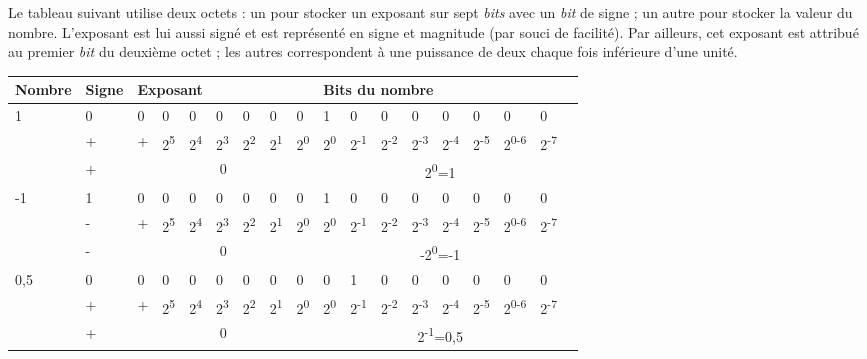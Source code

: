 Le tableau suivant utilise deux octets : un pour stocker un exposant sur
sept \emph{bits} avec un \emph{bit} de signe ; un autre pour stocker la
valeur du nombre. L'exposant est lui aussi signé et est représenté en
signe et magnitude (par souci de facilité). Par ailleurs, cet exposant
est attribué au premier \emph{bit} du deuxième octet ; les autres
correspondent à une puissance de deux chaque fois inférieure d'une
unité.

\begin{table}
\centering
\begin{tabular}{p{}|p{}|l|l|l|l|l|l|l|l|l|l|l|l|l|l|l|l|}\hline
  \rowcolor{gris-tab-entete}\bf Nombre&\bf Signe&\multicolumn{7}{l|}{\bf Exposant}&\multicolumn{8}{l|}{\bf Bits du nombre} \\
  \hline
  \multirow{3}{2cm}{1} & 0 & 0 & 0 & 0 & 0 & 0 & 0 & 0 & 1 & 0 & 0 & 0 & 0 & 0 & 0 & 0\\ 
  \cline{2-17}
    &+&+&2\textsuperscript{5}&2\textsuperscript{4}&2\textsuperscript{3}&2\textsuperscript{2}&2\textsuperscript{1}&2\textsuperscript{0}&2\textsuperscript{0}&2\textsuperscript{-1}&2\textsuperscript{-2}&2\textsuperscript{-3}&2\textsuperscript{-4}&2\textsuperscript{-5}&2\textsuperscript{0-6}&2\textsuperscript{-7}\\ 
  \cline{2-17}
    &+&\multicolumn{7}{c|}{0}&\multicolumn{8}{c|}{2\textsuperscript{0}=1}\\ 
  \hline
  
  \multirow{3}{2cm}{-1} & 1 & 0 & 0 & 0 & 0 & 0 & 0 & 0 & 1 & 0 & 0 & 0 & 0 & 0 & 0 & 0\\ 
  \cline{2-17}
    &-&+&2\textsuperscript{5}&2\textsuperscript{4}&2\textsuperscript{3}&2\textsuperscript{2}&2\textsuperscript{1}&2\textsuperscript{0}&2\textsuperscript{0}&2\textsuperscript{-1}&2\textsuperscript{-2}&2\textsuperscript{-3}&2\textsuperscript{-4}&2\textsuperscript{-5}&2\textsuperscript{0-6}&2\textsuperscript{-7}\\ 
  \cline{2-17}
    &-&\multicolumn{7}{c|}{0}&\multicolumn{8}{c|}{-2\textsuperscript{0}=-1}\\ 
  \hline
  
  \multirow{3}{2cm}{0,5} & 0 & 0 & 0 & 0 & 0 & 0 & 0 & 0 & 0 & 1 & 0 & 0 & 0 & 0 & 0 & 0\\ 
  \cline{2-17}
     &+&+&2\textsuperscript{5}&2\textsuperscript{4}&2\textsuperscript{3}&2\textsuperscript{2}&2\textsuperscript{1}&2\textsuperscript{0}&2\textsuperscript{0}&2\textsuperscript{-1}&2\textsuperscript{-2}&2\textsuperscript{-3}&2\textsuperscript{-4}&2\textsuperscript{-5}&2\textsuperscript{0-6}&2\textsuperscript{-7}\\ 
  \cline{2-17}
     &+&\multicolumn{7}{c|}{0}&\multicolumn{8}{c|}{2\textsuperscript{-1}=0,5}\\ 
  \hline
  

\end{tabular}
\end{table}
